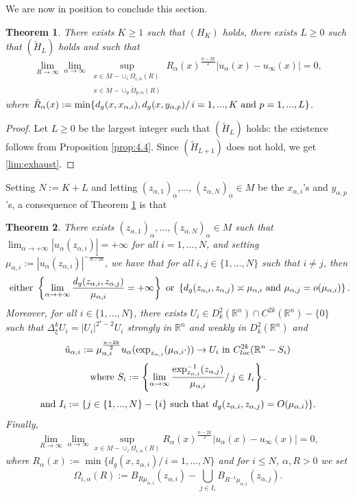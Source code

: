 \documentclass[reqno]{amsart}
\newtheorem{theorem}{Theorem}[section]
\def \rn {\mathbb{R}^n}
\def \crit {2^\star}
\def \ua {u_\alpha}
\def \xai {x_{\alpha,i}}
\def \mai {\mu_{\alpha,i}}
\def \tuai {\tilde{u}_{\alpha,i}}
\def \maj {\mu_{\alpha,j}}
\def \yap {y_{\alpha,p}}
\def \zai {z_{\alpha,i}}
\def \zaj {z_{\alpha,j}}
\begin{document}
We are now in position to conclude this section. 
\begin{theorem}\label{th:4.1} There exists $K\geq 1$ such that $(H_K)$ holds, there exists $L\geq 0$ such that $(\tilde{H}_L)$ holds and such that 
\begin{equation}\label{lim:exhaust}
\lim_{R\to \infty}\lim_{\alpha\to \infty}\sup_{\begin{array}{c}
x\in M-\cup_i\Omega_{i,\alpha}(R)\\
x\in M- \cup_p\tilde{\Omega}_{p,\alpha}(R)\end{array}} R_{\alpha}(x)^{\frac{n-2k}{2}}|\ua(x)-u_\infty(x)|=0,
\end{equation}
where $\tilde{R}_{\alpha}(x):=\min\{d_g(x,\xai),d_g(x, \yap)/\, i=1,...,K\hbox{ and }p=1,...,L\}$.
\end{theorem}
\begin{proof} Let $L\geq 0$ be the largest integer such that $(\tilde{H}_L)$ holds: the existence follows from Proposition \ref{prop:4.4}. Since $(\tilde{H}_{L+1})$ does not hold, we get \eqref{lim:exhaust}.\end{proof}
Setting $N:=K+L$ and letting $(z_{\alpha, 1})_\alpha$,..., $(z_{\alpha, N})_\alpha\in M$ be the $\xai$'s and $\yap$'s, a consequence of Theorem \ref{th:4.1} is that 
\begin{theorem}\label{th:exhaust:def} There exists $(z_{\alpha, 1})_\alpha,...,(z_{\alpha, N})_\alpha\in M$ such that $\lim_{\alpha\to +\infty}|\ua(\zai)|=+\infty$ for all $i=1,...,N$, and setting $\mai:=|\ua(\zai)|^{-\frac{2}{n-2k}}$, we have that for all $i,j\in \{1,...,N\}$ such that $i\neq j$, then
\begin{equation}\label{eq:53}
\hbox{ either }\left\{\lim_{\alpha\to +\infty}\frac{d_g(\zai,\zaj)}{\mai}=+\infty\right\}\hbox{ or }\left\{ d_g(\zai,\zaj)\asymp\mai\hbox{ and }\maj=o(\mai)\right\}.
\end{equation}
Moreover, for all $i\in \{1,...,N\}$, there exists $U_i\in D_k^2(\rn)\cap C^{2k}(\rn)-\{0\}$ such that $\Delta_\xi^k U_i=|U_i|^{\crit-2}U_i$ strongly in $\rn$ and weakly in $D_k^2(\rn)$ and
\begin{equation}\label{cv:tuai:bis}
\tuai :=\mai^{\frac{n-2k}{2}}\ua(\hbox{exp}_{\zai}(\mai \cdot))\to U_i\hbox{ in }C^{2k}_{loc}(\rn-S_i)
\end{equation} 
\begin{equation*}
\hbox{where }S_i:=\left\{\lim_{\alpha\to \infty}\frac{\hbox{exp}_{\zai}^{-1}(\zaj)}{\mai}/\, j\in I_i\right\}.
\end{equation*}
\begin{equation}\label{def:Ii}
\hbox{and }I_i:=\{j\in\{1,...,N\}-\{i\}\hbox{ such that }d_g(\zai,\zaj)=O(\mai)\}.
\end{equation}
Finally, 
\begin{equation}\label{lim:exhaust:bis}
\lim_{R\to \infty}\lim_{\alpha\to \infty}\sup_{x\in M-\cup_i\Omega_{i,\alpha}(R)} R_{\alpha}(x)^{\frac{n-2k}{2}}|\ua(x)-u_\infty(x)|=0,
\end{equation}
where $R_{\alpha}(x):=\min\{d_g(x,\zai)/\, i=1,...,N\}$ and for $i\leq N$, $\alpha,R>0$ we set
$$\Omega_{i,\alpha}(R):=B_{R\mai}(\zai) -\bigcup_{j\in I_i}B_{R^{-1}\mai}(\zaj).$$
\end{theorem}
\end{document}
